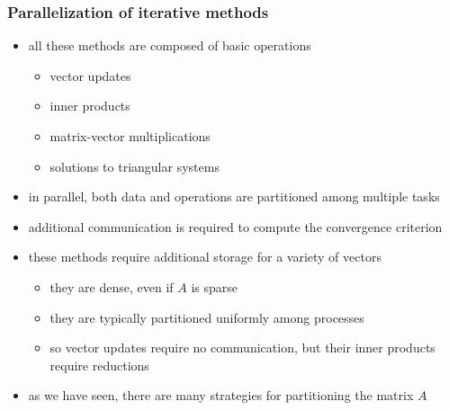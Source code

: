 \begin{frame}[fragile]
%
  \frametitle{Parallelization of iterative methods}
%
  \begin{itemize}
%
  \item all these methods are composed of basic operations
    \begin{itemize}
    \item vector updates
    \item inner products
    \item matrix-vector multiplications
    \item solutions to triangular systems
    \end{itemize}
%
  \item in parallel, both data and operations are partitioned among multiple tasks
%
  \item additional communication is required to compute the convergence criterion
%
  \item these methods require additional storage for a variety of vectors
    \begin{itemize}
    \item they are dense, even if $A$ is sparse
    \item they are typically partitioned uniformly among processes
    \item so vector updates require no communication, but their inner products require
      reductions
    \end{itemize}
%
  \item as we have seen, there are many strategies for partitioning the matrix $A$ 
%
  \end{itemize}
%
\end{frame}


